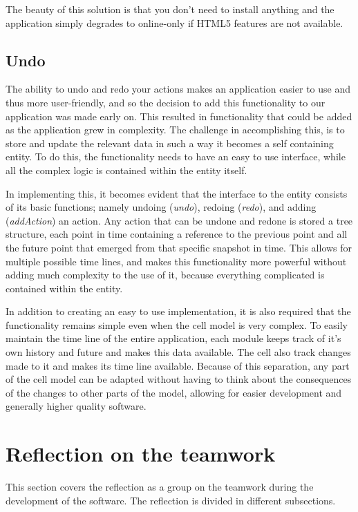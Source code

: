 \documentclass[10pt,a4paper]{report}
\begin{document}
			The beauty of this solution is that you don't need to install anything and the application simply degrades to online-only if HTML5 features are not available.
		
		\subsection{Undo}
			The ability to undo and redo your actions makes an application easier to use and thus more user-friendly, and so the decision to add this functionality to our application was made early on. This resulted in functionality that could be added as the application grew in complexity. The challenge in accomplishing this, is to store and update the relevant data in such a way it becomes a self containing entity. To do this, the functionality needs to have an easy to use interface, while all the complex logic is contained within the entity itself.
			
			In implementing this, it becomes evident that the interface to the entity consists of its basic functions; namely undoing (\emph{undo}), redoing (\emph{redo}), and adding (\emph{addAction}) an action. Any action that can be undone and redone is stored a tree structure, each point in time containing a reference to the previous point and all the future point that emerged from that specific snapshot in time. This allows for multiple possible time lines, and makes this functionality more powerful without adding much complexity to the use of it, because everything complicated is contained within the entity.

			In addition to creating an easy to use implementation, it is also required that the functionality remains simple even when the cell model is very complex. To easily maintain the time line of the entire application, each module keeps track of it's own history and future and makes this data available. The cell also track changes made to it and makes its time line available. Because of this separation, any part of the cell model can be adapted without having to think about the consequences of the changes to other parts of the model, allowing for easier development and generally higher quality software.
	
	\section{Reflection on the teamwork}
		This section covers the reflection as a group on the teamwork during the development of the software. The reflection is divided in different subsections.
\end{document}
